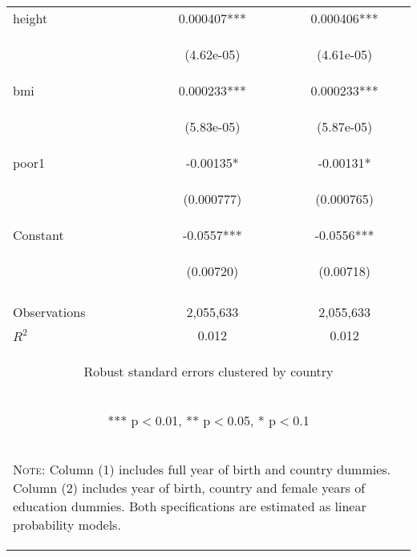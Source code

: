 \documentclass{article}[11pt,subeqn]
\begin{document}
\begin{spacing}{1.25}
\begin{table}[ht]
\begin{center}
\begin{tabular}{lcc}
height & 0.000407*** & 0.000406*** \\
\vspace{4pt} & \begin{footnotesize}(4.62e-05)\end{footnotesize} & \begin{footnotesize}(4.61e-05)\end{footnotesize} \\
bmi & 0.000233*** & 0.000233*** \\
\vspace{4pt} & \begin{footnotesize}(5.83e-05)\end{footnotesize} & \begin{footnotesize}(5.87e-05)\end{footnotesize} \\
poor1 & -0.00135* & -0.00131* \\
\vspace{4pt} & \begin{footnotesize}(0.000777)\end{footnotesize} & \begin{footnotesize}(0.000765)\end{footnotesize} \\
Constant & -0.0557*** & -0.0556*** \\
 & \begin{footnotesize}(0.00720)\end{footnotesize} & \begin{footnotesize}(0.00718)\end{footnotesize} \\
\vspace{4pt} & \begin{footnotesize}\end{footnotesize} & \begin{footnotesize}\end{footnotesize} \\
Observations & 2,055,633 & 2,055,633 \\
 $R^2$ & 0.012 & 0.012 \\ \midrule
\multicolumn{3}{c}{\begin{footnotesize} Robust standard errors clustered by country \end{footnotesize}} \\
\multicolumn{3}{c}{\begin{footnotesize} *** p$<$0.01, ** p$<$0.05, * p$<$0.1\end{footnotesize}} \\
\bottomrule
\multicolumn{3}{p{7.2cm}}{\setstretch{0.9}\begin{footnotesize}\textsc{Note:} Column (1) includes full year of birth and country
dummies.  Column (2) includes year of birth, country and female years of education dummies.  Both specifications are estimated
as linear probability models.\end{footnotesize}}\\
\end{tabular}
\end{center}
\end{table}


\end{spacing}
\end{document}
